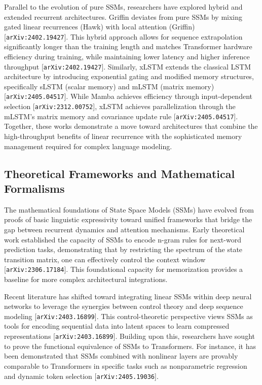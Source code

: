 \documentclass[11pt]{article}
\begin{document}
Parallel to the evolution of pure SSMs, researchers have explored hybrid and extended recurrent architectures. Griffin deviates from pure SSMs by mixing gated linear recurrences (Hawk) with local attention (Griffin) [\texttt{arXiv:2402.19427}]. This hybrid approach allows for sequence extrapolation significantly longer than the training length and matches Transformer hardware efficiency during training, while maintaining lower latency and higher inference throughput [\texttt{arXiv:2402.19427}]. Similarly, xLSTM extends the classical LSTM architecture by introducing exponential gating and modified memory structures, specifically sLSTM (scalar memory) and mLSTM (matrix memory) [\texttt{arXiv:2405.04517}]. While Mamba achieves efficiency through input-dependent selection [\texttt{arXiv:2312.00752}], xLSTM achieves parallelization through the mLSTM's matrix memory and covariance update rule [\texttt{arXiv:2405.04517}]. Together, these works demonstrate a move toward architectures that combine the high-throughput benefits of linear recurrence with the sophisticated memory management required for complex language modeling.

\subsection{Theoretical Frameworks and Mathematical Formalisms}

The mathematical foundations of State Space Models (SSMs) have evolved from proofs of basic linguistic expressivity toward unified frameworks that bridge the gap between recurrent dynamics and attention mechanisms. Early theoretical work established the capacity of SSMs to encode n-gram rules for next-word prediction tasks, demonstrating that by restricting the spectrum of the state transition matrix, one can effectively control the context window [\texttt{arXiv:2306.17184}]. This foundational capacity for memorization provides a baseline for more complex architectural integrations.

Recent literature has shifted toward integrating linear SSMs within deep neural networks to leverage the synergies between control theory and deep sequence modeling [\texttt{arXiv:2403.16899}]. This control-theoretic perspective views SSMs as tools for encoding sequential data into latent spaces to learn compressed representations [\texttt{arXiv:2403.16899}]. Building upon this, researchers have sought to prove the functional equivalence of SSMs to Transformers. For instance, it has been demonstrated that SSMs combined with nonlinear layers are provably comparable to Transformers in specific tasks such as nonparametric regression and dynamic token selection [\texttt{arXiv:2405.19036}].
\end{document}
